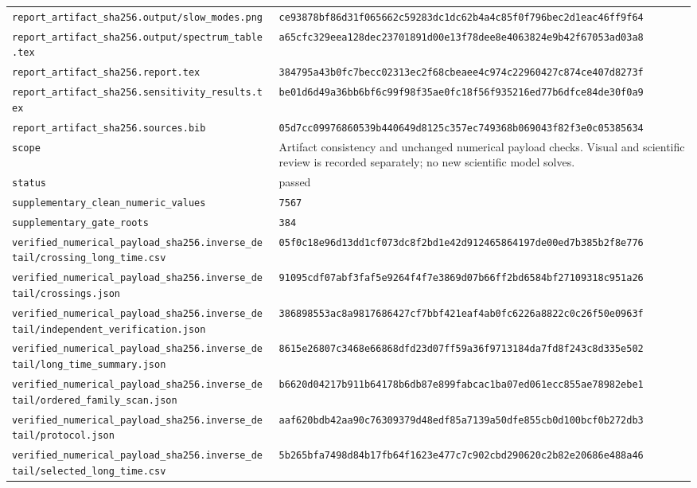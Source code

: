 \begin{longtable}{p{.46\linewidth}p{.46\linewidth}}
\nolinkurl{report_artifact_sha256.output/slow_modes.png} & \nolinkurl{ce93878bf86d31f065662c59283dc1dc62b4a4c85f0f796bec2d1eac46ff9f64} \\
\nolinkurl{report_artifact_sha256.output/spectrum_table.tex} & \nolinkurl{a65cfc329eea128dec23701891d00e13f78dee8e4063824e9b42f67053ad03a8} \\
\nolinkurl{report_artifact_sha256.report.tex} & \nolinkurl{384795a43b0fc7becc02313ec2f68cbeaee4c974c22960427c874ce407d8273f} \\
\nolinkurl{report_artifact_sha256.sensitivity_results.tex} & \nolinkurl{be01d6d49a36bb6bf6c99f98f35ae0fc18f56f935216ed77b6dfce84de30f0a9} \\
\nolinkurl{report_artifact_sha256.sources.bib} & \nolinkurl{05d7cc09976860539b440649d8125c357ec749368b069043f82f3e0c05385634} \\
\nolinkurl{scope} & Artifact consistency and unchanged numerical payload checks. Visual and scientific review is recorded separately; no new scientific model solves. \\
\nolinkurl{status} & passed \\
\nolinkurl{supplementary_clean_numeric_values} & \texttt{7567} \\
\nolinkurl{supplementary_gate_roots} & \texttt{384} \\
\nolinkurl{verified_numerical_payload_sha256.inverse_detail/crossing_long_time.csv} & \nolinkurl{05f0c18e96d13dd1cf073dc8f2bd1e42d912465864197de00ed7b385b2f8e776} \\
\nolinkurl{verified_numerical_payload_sha256.inverse_detail/crossings.json} & \nolinkurl{91095cdf07abf3faf5e9264f4f7e3869d07b66ff2bd6584bf27109318c951a26} \\
\nolinkurl{verified_numerical_payload_sha256.inverse_detail/independent_verification.json} & \nolinkurl{386898553ac8a9817686427cf7bbf421eaf4ab0fc6226a8822c0c26f50e0963f} \\
\nolinkurl{verified_numerical_payload_sha256.inverse_detail/long_time_summary.json} & \nolinkurl{8615e26807c3468e66868dfd23d07ff59a36f9713184da7fd8f243c8d335e502} \\
\nolinkurl{verified_numerical_payload_sha256.inverse_detail/ordered_family_scan.json} & \nolinkurl{b6620d04217b911b64178b6db87e899fabcac1ba07ed061ecc855ae78982ebe1} \\
\nolinkurl{verified_numerical_payload_sha256.inverse_detail/protocol.json} & \nolinkurl{aaf620bdb42aa90c76309379d48edf85a7139a50dfe855cb0d100bcf0b272db3} \\
\nolinkurl{verified_numerical_payload_sha256.inverse_detail/selected_long_time.csv} & \nolinkurl{5b265bfa7498d84b17fb64f1623e477c7c902cbd290620c2b82e20686e488a46} \\

\end{longtable}
